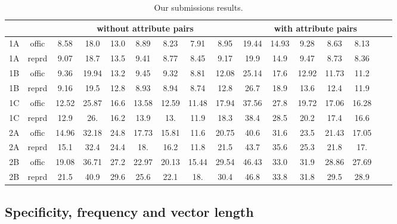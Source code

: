 \documentclass[11pt,a4paper]{article}
\begin{document}
\begin{table*}
  \begin{tabular}{cc|ccccccc|ccccccc}
    \toprule
&&\multicolumn{7}{c}{without attribute pairs} & \multicolumn{7}{c}{with attribute pairs} \\
\midrule
    1A	&	offic	&	8.58	&	18.0	&	13.0	&	8.89	&	8.23	&	7.91	&	8.95	&	19.44	&	14.93	&	9.28	&	8.63	&	8.13	\\
    1A	&	reprd	&9.07&18.7	&13.5	&9.41&8.77&8.45& 9.17	&19.9	&14.9	
    &9.47	&8.73	&8.36		\\
    1B	&	offic	&	9.36	&	19.94	&	13.2	&	9.45	&	9.32	&	8.81	&12.08	& 25.14	&	17.6	&	12.92	&	11.73	&	11.2	\\
    1B	&	reprd	&9.16&19.5	&12.8	&8.93&8.94&8.74&12.8	&26.7	&18.9	
    &13.6	&12.4	&11.9	\\
    1C	&	offic	&	12.52	&	25.87	&	16.6	&	13.58	&	12.59	&	11.48	&17.94	&	37.56	&	27.8	&	19.72	&	17.06	&	16.28	\\
    1C	&	reprd	&12.9	&26.	& 16.2	&13.9	&13.	&11.9	& 18.3	
    &38.4	&28.5	&20.2	&17.4	& 16.6	\\
    2A	&	offic	&	14.96	&	32.18	&	24.8	&	17.73	&	15.81	&	11.6	&20.75	&	40.6	&	31.6	&	23.5	&	21.43	&	17.05	\\
    2A	&	reprd	&15.1	&32.4	& 24.4	&18.	&16.2	&11.8	&21.5	
    &43.7	&35.6	&25.3	&21.8	&17.	\\
    2B	&	offic	&	19.08	&	36.71	&	27.2	&	22.97	&	20.13	&	15.44	&29.54	&	46.43	&	33.0	&	31.9	&	28.86	&	27.69	\\
    2B	&	reprd	&21.5	&40.9	&29.6	&25.6	&22.1	&18.	&30.4	
    &46.8	&33.8	&31.8	&29.5	&28.9	\\
    \bottomrule
  \end{tabular}
  \caption{Our submissions results.}
  \label{table:submissions}
\end{table*}



\subsection{Specificity, frequency and vector length}
\end{document}
